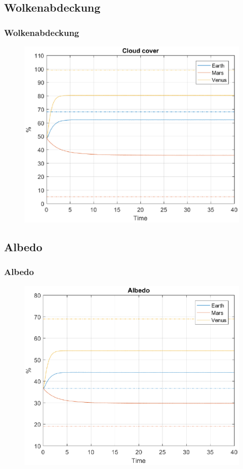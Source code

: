 \documentclass{beamer}
\begin{document}
\subsection{Wolkenabdeckung}
\begin{frame}
	\frametitle{Wolkenabdeckung}
		\begin{figure}
			\includegraphics[width=\linewidth]{Matlab/figures/cloudCover.eps}
		\end{figure}
\end{frame}

\subsection{Albedo}
\begin{frame}
	\frametitle{Albedo}
		\begin{figure}
			\includegraphics[width=\linewidth]{Matlab/figures/albedo.eps}
		\end{figure}
\end{frame}
\end{document}
